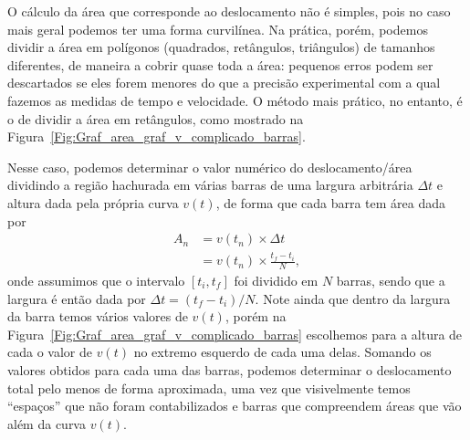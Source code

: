 O cálculo da área que corresponde ao deslocamento não é simples, pois no caso mais geral podemos ter uma forma curvilínea. Na prática, porém, podemos dividir a área em polígonos (quadrados, retângulos, triângulos) de tamanhos diferentes, de maneira a cobrir quase toda a área: pequenos erros podem ser descartados se eles forem menores do que a precisão experimental com a qual fazemos as medidas de tempo e velocidade. O método mais prático, no entanto, é o de dividir a área em retângulos, como mostrado na Figura~\ref{Fig:Graf_area_graf_v_complicado_barras}.

Nesse caso, podemos determinar o valor numérico do deslocamento/área dividindo a região hachurada em várias barras de uma largura arbitrária $\Delta t$ e altura dada pela própria curva $v(t)$, de forma que cada barra tem área dada por
\begin{align}
    A_n &= v(t_n) \times \Delta t \\
    &= v(t_n) \times \frac{t_f - t_i}{N},
\end{align}
%
onde assumimos que o intervalo $[t_i, t_f]$ foi dividido em $N$ barras, sendo que a largura é então dada por $\Delta t = (t_f - t_i) / N$. Note ainda que dentro da largura da barra temos vários valores de $v(t)$, porém na Figura~\ref{Fig:Graf_area_graf_v_complicado_barras} escolhemos para a altura de cada o valor de $v(t)$ no extremo esquerdo de cada uma delas. Somando os valores obtidos para cada uma das barras, podemos determinar o deslocamento total pelo menos de forma aproximada, uma vez que visivelmente temos ``espaços'' que não foram contabilizados e barras que compreendem áreas que vão além da curva $v(t)$.

